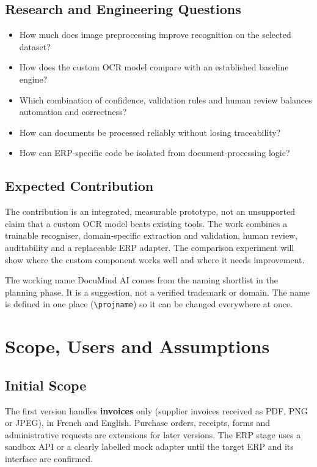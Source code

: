 \documentclass[11pt,a4paper]{report}
\newcommand{\projname}{DocuMind AI}
\begin{document}
\section{Research and Engineering Questions}
\begin{itemize}
\item How much does image preprocessing improve recognition on the selected dataset?
\item How does the custom OCR model compare with an established baseline engine?
\item Which combination of confidence, validation rules and human review balances automation and correctness?
\item How can documents be processed reliably without losing traceability?
\item How can ERP-specific code be isolated from document-processing logic?
\end{itemize}

\section{Expected Contribution}
The contribution is an integrated, measurable prototype, not an unsupported claim that a custom OCR model beats existing tools. The work combines a trainable recogniser, domain-specific extraction and validation, human review, auditability and a replaceable ERP adapter. The comparison experiment will show where the custom component works well and where it needs improvement.

\begin{infobox}
The working name \projname{} comes from the naming shortlist in the planning phase. It is a suggestion, not a verified trademark or domain. The name is defined in one place (\texttt{\textbackslash projname}) so it can be changed everywhere at once.
\end{infobox}

\chapter{Scope, Users and Assumptions}
\section{Initial Scope}
The first version handles \textbf{invoices} only (supplier invoices received as PDF, PNG or JPEG), in French and English. Purchase orders, receipts, forms and administrative requests are extensions for later versions. The ERP stage uses a sandbox API or a clearly labelled mock adapter until the target ERP and its interface are confirmed.
\end{document}
